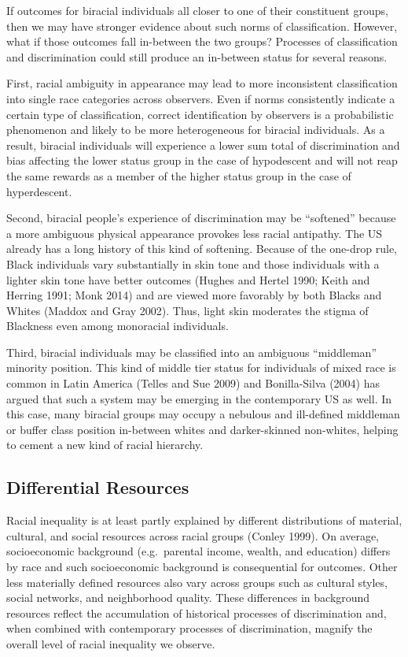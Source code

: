 \documentclass[
  letterpaper,
  DIV=11,
  numbers=noendperiod]{scrartcl}
\begin{document}
If outcomes for biracial individuals all closer to one of their
constituent groups, then we may have stronger evidence about such norms
of classification. However, what if those outcomes fall in-between the
two groups? Processes of classification and discrimination could still
produce an in-between status for several reasons.

First, racial ambiguity in appearance may lead to more inconsistent
classification into single race categories across observers. Even if
norms consistently indicate a certain type of classification, correct
identification by observers is a probabilistic phenomenon and likely to
be more heterogeneous for biracial individuals. As a result, biracial
individuals will experience a lower sum total of discrimination and bias
affecting the lower status group in the case of hypodescent and will not
reap the same rewards as a member of the higher status group in the case
of hyperdescent.

Second, biracial people's experience of discrimination may be
``softened'' because a more ambiguous physical appearance provokes less
racial antipathy. The US already has a long history of this kind of
softening. Because of the one-drop rule, Black individuals vary
substantially in skin tone and those individuals with a lighter skin
tone have better outcomes (Hughes and Hertel 1990; Keith and Herring
1991; Monk 2014) and are viewed more favorably by both Blacks and Whites
(Maddox and Gray 2002). Thus, light skin moderates the stigma of
Blackness even among monoracial individuals.

Third, biracial individuals may be classified into an ambiguous
``middleman'' minority position. This kind of middle tier status for
individuals of mixed race is common in Latin America (Telles and Sue
2009) and Bonilla-Silva (2004) has argued that such a system may be
emerging in the contemporary US as well. In this case, many biracial
groups may occupy a nebulous and ill-defined middleman or buffer class
position in-between whites and darker-skinned non-whites, helping to
cement a new kind of racial hierarchy.

\hypertarget{differential-resources}{%
\subsection{Differential Resources}\label{differential-resources}}

Racial inequality is at least partly explained by different
distributions of material, cultural, and social resources across racial
groups (Conley 1999). On average, socioeconomic background
(e.g.~parental income, wealth, and education) differs by race and such
socioeconomic background is consequential for outcomes. Other less
materially defined resources also vary across groups such as cultural
styles, social networks, and neighborhood quality. These differences in
background resources reflect the accumulation of historical processes of
discrimination and, when combined with contemporary processes of
discrimination, magnify the overall level of racial inequality we
observe.
\end{document}
